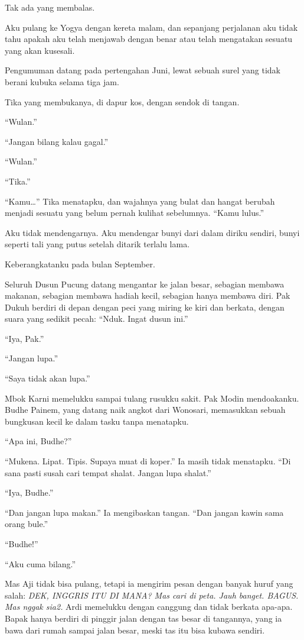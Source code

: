\documentclass[11pt,twoside,openany]{book}
\makeatletter
\newcommand{\scenebreak}{\par\vspace{0.9em}{\centering\textsc{*\hspace{0.7em}*\hspace{0.7em}*}\par}\vspace{0.9em}\@afterindentfalse\@afterheading}
\makeatother
\begin{document}
Tak ada yang membalas.

Aku pulang ke Yogya dengan kereta malam, dan sepanjang perjalanan aku tidak tahu apakah aku telah menjawab dengan benar atau telah mengatakan sesuatu yang akan kusesali.

\scenebreak
Pengumuman datang pada pertengahan Juni, lewat sebuah surel yang tidak berani kubuka selama tiga jam.

Tika yang membukanya, di dapur kos, dengan sendok di tangan.

``Wulan.''

``Jangan bilang kalau gagal.''

``Wulan.''

``Tika.''

``Kamu\ldots{}'' Tika menatapku, dan wajahnya yang bulat dan hangat berubah menjadi sesuatu yang belum pernah kulihat sebelumnya. ``Kamu lulus.''

Aku tidak mendengarnya. Aku mendengar bunyi dari dalam diriku sendiri, bunyi seperti tali yang putus setelah ditarik terlalu lama.

\scenebreak
Keberangkatanku pada bulan September.

Seluruh Dusun Pucung datang mengantar ke jalan besar, sebagian membawa makanan, sebagian membawa hadiah kecil, sebagian hanya membawa diri. Pak Dukuh berdiri di depan dengan peci yang miring ke kiri dan berkata, dengan suara yang sedikit pecah: ``Nduk. Ingat dusun ini.''

``Iya, Pak.''

``Jangan lupa.''

``Saya tidak akan lupa.''

Mbok Karni memelukku sampai tulang rusukku sakit. Pak Modin mendoakanku. Budhe Painem, yang datang naik angkot dari Wonosari, memasukkan sebuah bungkusan kecil ke dalam tasku tanpa menatapku.

``Apa ini, Budhe?''

``Mukena. Lipat. Tipis. Supaya muat di koper.'' Ia masih tidak menatapku. ``Di sana pasti susah cari tempat shalat. Jangan lupa shalat.''

``Iya, Budhe.''

``Dan jangan lupa makan.'' Ia mengibaskan tangan. ``Dan jangan kawin sama orang bule.''

``Budhe!''

``Aku cuma bilang.''

Mas Aji tidak bisa pulang, tetapi ia mengirim pesan dengan banyak huruf yang salah: \emph{DEK, INGGRIS ITU DI MANA? Mas cari di peta. Jauh banget. BAGUS. Mas nggak sia2.} Ardi memelukku dengan canggung dan tidak berkata apa-apa. Bapak hanya berdiri di pinggir jalan dengan tas besar di tangannya, yang ia bawa dari rumah sampai jalan besar, meski tas itu bisa kubawa sendiri.
\end{document}
